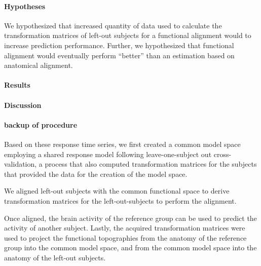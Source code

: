 \paragraph{Hypotheses}

%
We hypothesized that increased quantity of data used to calculate the
transformation matrices of left-out subjects for a functional alignment would to
increase prediction performance.
%
Further, we hypothesized that functional alignment would eventually perform
``better'' than an estimation based on anatomical alignment.


\paragraph{Results}



\paragraph{Discussion}



\paragraph{backup of procedure}


Based on these response time series, we first created a common model space
employing a shared response model \citep{chen2015reduced} following
leave-one-subject out cross-validation, a process that also computed
transformation matrices for the subjects that provided the data for the creation
of the model space.

We aligned left-out subjects with the common functional space to derive
transformation matrices for the left-out-subjects to perform the alignment.

%
Once aligned, the brain activity of the reference group can be used to predict
the activity of another subject.
Lastly, the acquired transformation matrices were used to project the functional
topographies from the anatomy of the reference group into the common model
space, and from the common model space into the anatomy of the left-out
subjects.
